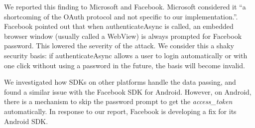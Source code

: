 We reported this finding to Microsoft and Facebook.  Microsoft considered it ``a shortcoming of the OAuth protocol and not specific to our implementation.''.  Facebook pointed out that when authenticateAsync is called, an embedded browser window (usually called a WebView) is always prompted for Facebook password.  This lowered the severity of the attack.  We consider this a shaky security basis: if authenticateAsync allows a user to login automatically or with one click without using a password in the future, the basis will become invalid. 

We investigated how SDKs on other platforms handle the data passing, and found a similar issue with the Facebook SDK for Android.  However, on Android, there is a mechanism to skip the password prompt to get the \emph{access\_token} automatically. In response to our report, Facebook is developing a fix for its Android SDK.